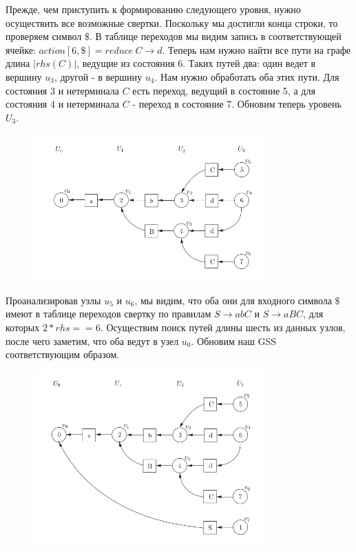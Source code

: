 Прежде, чем приступить к формированию следующего уровня, нужно осуществить все возможные свертки. Поскольку мы достигли конца строки, то проверяем символ $\$$. В таблице переходов мы видим запись в соответствующей ячейке: $action[6, \$] = reduce\ C \rightarrow d$. Теперь нам нужно найти все пути на графе длина $|rhs(C)|$, ведущие из состояния 6. Таких путей два: один ведет в вершину $u_3$, другой - в вершину $u_4$. Нам нужно обработать оба этих пути. Для состояния 3 и нетерминала $C$ есть переход, ведущий в состояние 5, а для состояния 4 и нетерминала $C$ - переход в состояние 7. Обновим теперь уровень $U_3$.
\begin{figure}[H]
\centering
\includegraphics[width=0.8\textwidth]{img/gss-step5.png}
\end{figure}

Проанализировав узлы $u_5$ и $u_6$, мы видим, что оба они для входного символа $\$$ имеют в таблице переходов свертку по правилам $S \rightarrow abC$ и $S \rightarrow aBC$, для которых $2 * rhs == 6$. Осуществим поиск путей длины шесть из данных узлов, после чего заметим, что оба ведут в узел $u_0$. Обновим наш GSS соответствующим образом. 
\begin{figure}[H]
\centering
\includegraphics[width=0.8\textwidth]{img/gss-step6.png}
\end{figure}

